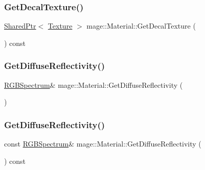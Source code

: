 \hypertarget{structmage_1_1_material_a7cf62e3f72b74c945e3d5c47c2c73485}{}\label{structmage_1_1_material_a7cf62e3f72b74c945e3d5c47c2c73485} 
\subsubsection{\texorpdfstring{Get\+Decal\+Texture()}{GetDecalTexture()}}
{\footnotesize\ttfamily \hyperlink{namespacemage_a1e01ae66713838a7a67d30e44c67703e}{Shared\+Ptr}$<$ \hyperlink{classmage_1_1_texture}{Texture} $>$ mage\+::\+Material\+::\+Get\+Decal\+Texture (\begin{DoxyParamCaption}{ }\end{DoxyParamCaption}) const\hspace{0.3cm}{\ttfamily [noexcept]}}

\hypertarget{structmage_1_1_material_afb37e1cd37df82b6607a4e5998e58ea8}{}\label{structmage_1_1_material_afb37e1cd37df82b6607a4e5998e58ea8} 
\subsubsection{\texorpdfstring{Get\+Diffuse\+Reflectivity()}{GetDiffuseReflectivity()}\hspace{0.1cm}{\footnotesize\ttfamily [1/2]}}
{\footnotesize\ttfamily \hyperlink{structmage_1_1_r_g_b_spectrum}{R\+G\+B\+Spectrum}\& mage\+::\+Material\+::\+Get\+Diffuse\+Reflectivity (\begin{DoxyParamCaption}{ }\end{DoxyParamCaption})\hspace{0.3cm}{\ttfamily [noexcept]}}

\hypertarget{structmage_1_1_material_a046b0d8eece74bd68538fefd03c1f294}{}\label{structmage_1_1_material_a046b0d8eece74bd68538fefd03c1f294} 
\subsubsection{\texorpdfstring{Get\+Diffuse\+Reflectivity()}{GetDiffuseReflectivity()}\hspace{0.1cm}{\footnotesize\ttfamily [2/2]}}
{\footnotesize\ttfamily const \hyperlink{structmage_1_1_r_g_b_spectrum}{R\+G\+B\+Spectrum}\& mage\+::\+Material\+::\+Get\+Diffuse\+Reflectivity (\begin{DoxyParamCaption}{ }\end{DoxyParamCaption}) const\hspace{0.3cm}{\ttfamily [noexcept]}}


